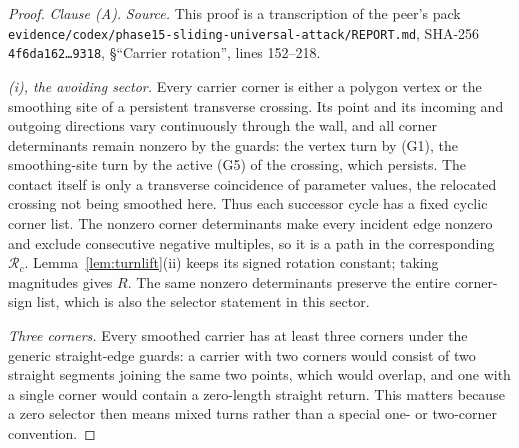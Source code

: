 \begin{proof}
\emph{Clause (A).}
\emph{Source.} This proof is a transcription of the peer's pack \texttt{evidence/codex/phase15-sliding-universal-attack/REPORT.md}, SHA-256 \texttt{4f6da162\dots9318}, §``Carrier rotation'', lines 152--218.

\emph{(i), the avoiding sector.} Every carrier corner is either a polygon
vertex or the smoothing site of a persistent transverse crossing. Its point and
its incoming and outgoing directions vary continuously through the wall, and all
corner determinants remain nonzero by the guards: the vertex turn by (G1), the
smoothing-site turn by the active (G5) of the crossing, which persists. The
contact itself is only a transverse coincidence of parameter values, the
relocated crossing not being smoothed here. Thus each successor cycle has a fixed cyclic corner list. The nonzero
corner determinants make every incident edge nonzero and exclude consecutive
negative multiples, so it is a path in the corresponding $\mathcal R_c$.
Lemma~\ref{lem:turnlift}(ii) keeps its signed rotation constant; taking
magnitudes gives $R$. The same nonzero
determinants preserve the entire corner-sign list, which is also the selector
statement in this sector.

\emph{Three corners.} Every smoothed carrier has at least three corners under
the generic straight-edge guards: a carrier with two corners would consist of
two straight segments joining the same two points, which would overlap, and one
with a single corner would contain a zero-length straight return. This matters
because a zero selector then means mixed turns rather than a special one- or
two-corner convention.


\end{proof}
